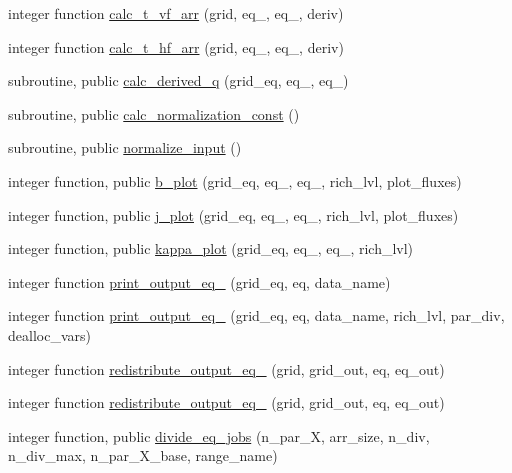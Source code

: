 \begin{DoxyCompactItemize}
\item 
integer function \hyperlink{namespaceeq__ops_a9fe661ac183df2bdf7a96b4450be21aa}{calc\+\_\+t\+\_\+vf\+\_\+arr} (grid, eq\+\_, eq\+\_, deriv)
\item 
integer function \hyperlink{namespaceeq__ops_a64fe3de828eafa02ef635def9acafaed}{calc\+\_\+t\+\_\+hf\+\_\+arr} (grid, eq\+\_, eq\+\_, deriv)
\item 
subroutine, public \hyperlink{namespaceeq__ops_a8f774acd7a5af5e9ca315907e3d7a885}{calc\+\_\+derived\+\_\+q} (grid\+\_\+eq, eq\+\_, eq\+\_)
\item 
subroutine, public \hyperlink{namespaceeq__ops_a09b10d95cd83c89e817664a954f7555d}{calc\+\_\+normalization\+\_\+const} ()
\item 
subroutine, public \hyperlink{namespaceeq__ops_a1b4c764da73624722d7e76498a2b80a9}{normalize\+\_\+input} ()
\item 
integer function, public \hyperlink{namespaceeq__ops_a9dab060a0bbbbaf6c8ccb66e1f5f160b}{b\+\_\+plot} (grid\+\_\+eq, eq\+\_, eq\+\_, rich\+\_\+lvl, plot\+\_\+fluxes)
\item 
integer function, public \hyperlink{namespaceeq__ops_af611fc0c83d1ab5ed8940d9a1a652d6c}{j\+\_\+plot} (grid\+\_\+eq, eq\+\_, eq\+\_, rich\+\_\+lvl, plot\+\_\+fluxes)
\item 
integer function, public \hyperlink{namespaceeq__ops_a9ecb744b3812fe838f13c9886307da24}{kappa\+\_\+plot} (grid\+\_\+eq, eq\+\_, eq\+\_, rich\+\_\+lvl)
\item 
integer function \hyperlink{namespaceeq__ops_ad7c123990ab1ff23dbd71bb47c3181b8}{print\+\_\+output\+\_\+eq\+\_} (grid\+\_\+eq, eq, data\+\_\+name)
\item 
integer function \hyperlink{namespaceeq__ops_a479e914bb96e5269af860cae149e1a73}{print\+\_\+output\+\_\+eq\+\_} (grid\+\_\+eq, eq, data\+\_\+name, rich\+\_\+lvl, par\+\_\+div, dealloc\+\_\+vars)
\item 
integer function \hyperlink{namespaceeq__ops_adc3d3173255a02f750a4d2c0f1b30044}{redistribute\+\_\+output\+\_\+eq\+\_} (grid, grid\+\_\+out, eq, eq\+\_\+out)
\item 
integer function \hyperlink{namespaceeq__ops_a34003959915249394273824108af61e0}{redistribute\+\_\+output\+\_\+eq\+\_} (grid, grid\+\_\+out, eq, eq\+\_\+out)
\item 
integer function, public \hyperlink{namespaceeq__ops_a8fae749abe55865d8135fef536a8e8f1}{divide\+\_\+eq\+\_\+jobs} (n\+\_\+par\+\_\+X, arr\+\_\+size, n\+\_\+div, n\+\_\+div\+\_\+max, n\+\_\+par\+\_\+\+X\+\_\+base, range\+\_\+name)

\end{DoxyCompactItemize}
